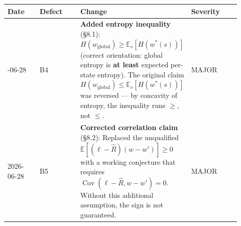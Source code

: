 \documentclass[
  12pt,
]{article}
\begin{document}
\begin{longtable}[]{@{}p{0.18\linewidth}p{0.23\linewidth}p{0.23\linewidth}p{0.28\linewidth}@{}}
\toprule\noalign{}
\begin{minipage}[b]{\linewidth}\raggedright
Date
\end{minipage} & \begin{minipage}[b]{\linewidth}\raggedright
Defect
\end{minipage} & \begin{minipage}[b]{\linewidth}\raggedright
Change
\end{minipage} & \begin{minipage}[b]{\linewidth}\raggedright
Severity
\end{minipage} \\
\midrule\noalign{}
\endhead
\bottomrule\noalign{}
\endlastfoot
2026-06-28 & B4 & \textbf{Added entropy inequality} (\S8.1):
\(H(w_{\text{global}}) \geq \mathbb{E}_s[H(w^*(s))]\) (correct
orientation: global entropy is \textbf{at least} expected per-state
entropy). The original claim
\(H(w_{\text{global}}) \leq \mathbb{E}_s[H(w^*(s))]\) was reversed ---
by concavity of entropy, the inequality runs \(\geq\), not \(\leq\). &
MAJOR \\
2026-06-28 & B5 & \textbf{Corrected correlation claim} (\S8.2): Replaced
the unqualified \(\mathbb{E}[(\ell - \hat{R})(w - w')] \geq 0\) with a
working conjecture that requires
\(\operatorname{Cov}(\ell - \hat{R}, w - w') = 0\). Without this
additional assumption, the sign is not guaranteed. & MAJOR \\
\end{longtable}
\end{document}
